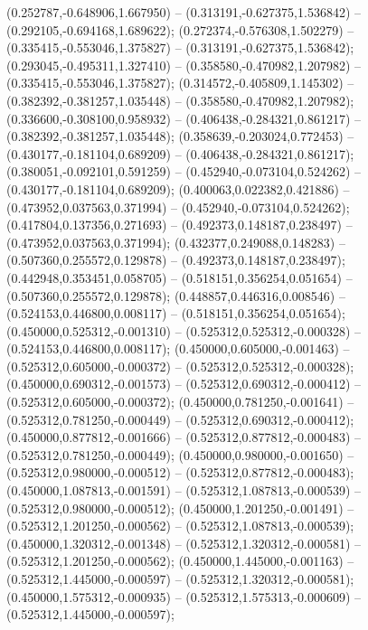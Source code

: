  (0.252787,-0.648906,1.667950) -- (0.313191,-0.627375,1.536842) -- (0.292105,-0.694168,1.689622);
 (0.272374,-0.576308,1.502279) -- (0.335415,-0.553046,1.375827) -- (0.313191,-0.627375,1.536842);
 (0.293045,-0.495311,1.327410) -- (0.358580,-0.470982,1.207982) -- (0.335415,-0.553046,1.375827);
 (0.314572,-0.405809,1.145302) -- (0.382392,-0.381257,1.035448) -- (0.358580,-0.470982,1.207982);
 (0.336600,-0.308100,0.958932) -- (0.406438,-0.284321,0.861217) -- (0.382392,-0.381257,1.035448);
 (0.358639,-0.203024,0.772453) -- (0.430177,-0.181104,0.689209) -- (0.406438,-0.284321,0.861217);
 (0.380051,-0.092101,0.591259) -- (0.452940,-0.073104,0.524262) -- (0.430177,-0.181104,0.689209);
 (0.400063,0.022382,0.421886) -- (0.473952,0.037563,0.371994) -- (0.452940,-0.073104,0.524262);
 (0.417804,0.137356,0.271693) -- (0.492373,0.148187,0.238497) -- (0.473952,0.037563,0.371994);
 (0.432377,0.249088,0.148283) -- (0.507360,0.255572,0.129878) -- (0.492373,0.148187,0.238497);
 (0.442948,0.353451,0.058705) -- (0.518151,0.356254,0.051654) -- (0.507360,0.255572,0.129878);
 (0.448857,0.446316,0.008546) -- (0.524153,0.446800,0.008117) -- (0.518151,0.356254,0.051654);
 (0.450000,0.525312,-0.001310) -- (0.525312,0.525312,-0.000328) -- (0.524153,0.446800,0.008117);
 (0.450000,0.605000,-0.001463) -- (0.525312,0.605000,-0.000372) -- (0.525312,0.525312,-0.000328);
 (0.450000,0.690312,-0.001573) -- (0.525312,0.690312,-0.000412) -- (0.525312,0.605000,-0.000372);
 (0.450000,0.781250,-0.001641) -- (0.525312,0.781250,-0.000449) -- (0.525312,0.690312,-0.000412);
 (0.450000,0.877812,-0.001666) -- (0.525312,0.877812,-0.000483) -- (0.525312,0.781250,-0.000449);
 (0.450000,0.980000,-0.001650) -- (0.525312,0.980000,-0.000512) -- (0.525312,0.877812,-0.000483);
 (0.450000,1.087813,-0.001591) -- (0.525312,1.087813,-0.000539) -- (0.525312,0.980000,-0.000512);
 (0.450000,1.201250,-0.001491) -- (0.525312,1.201250,-0.000562) -- (0.525312,1.087813,-0.000539);
 (0.450000,1.320312,-0.001348) -- (0.525312,1.320312,-0.000581) -- (0.525312,1.201250,-0.000562);
 (0.450000,1.445000,-0.001163) -- (0.525312,1.445000,-0.000597) -- (0.525312,1.320312,-0.000581);
 (0.450000,1.575312,-0.000935) -- (0.525312,1.575313,-0.000609) -- (0.525312,1.445000,-0.000597);
